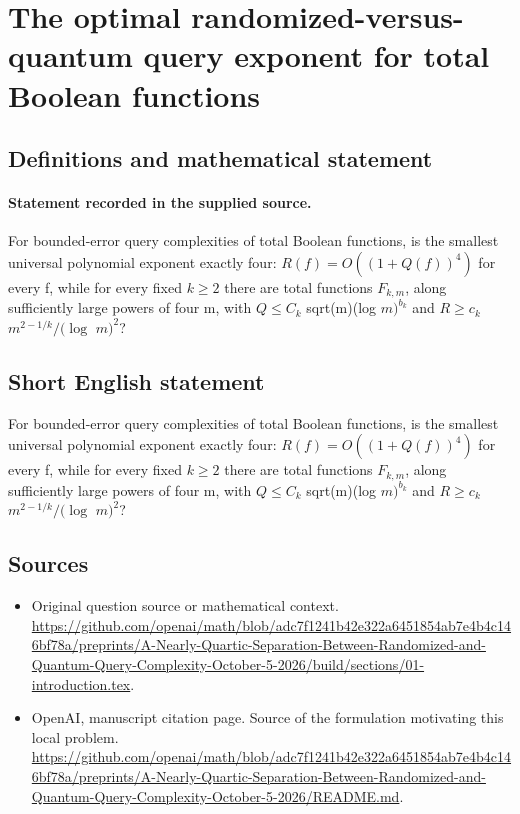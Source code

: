 \documentclass[11pt]{article}
\begin{document}
\section*{The optimal randomized-versus-quantum query exponent for total Boolean functions}\label{statement}
\subsection{Definitions and mathematical statement}
\paragraph{Statement recorded in the supplied source.}
For bounded-error query complexities of total Boolean functions, is the smallest universal polynomial exponent exactly four: $R(f)=O((1+Q(f))^4)$ for every f, while for every fixed $k\geq 2$ there are total functions $F_{k,m}$, along sufficiently large powers of four m, with $Q\leq C_k$ sqrt(m)(log $m)^{b_k}$ and $R\geq c_k$ $m^{2-1/k}/(\log $ $m)^2$?
\subsection{Short English statement}
For bounded-error query complexities of total Boolean functions, is the smallest universal polynomial exponent exactly four: $R(f)=O((1+Q(f))^4)$ for every f, while for every fixed $k\geq 2$ there are total functions $F_{k,m}$, along sufficiently large powers of four m, with $Q\leq C_k$ sqrt(m)(log $m)^{b_k}$ and $R\geq c_k$ $m^{2-1/k}/(\log $ $m)^2$?
\subsection{Sources}
\begin{itemize}
\item[S1] Original question source or mathematical context.
\url{https://github.com/openai/math/blob/adc7f1241b42e322a6451854ab7e4b4c146bf78a/preprints/A-Nearly-Quartic-Separation-Between-Randomized-and-Quantum-Query-Complexity-October-5-2026/build/sections/01-introduction.tex}.
\item[S2] OpenAI, manuscript citation page. Source of the formulation motivating this local problem.
\url{https://github.com/openai/math/blob/adc7f1241b42e322a6451854ab7e4b4c146bf78a/preprints/A-Nearly-Quartic-Separation-Between-Randomized-and-Quantum-Query-Complexity-October-5-2026/README.md}.
\end{itemize}
\end{document}
